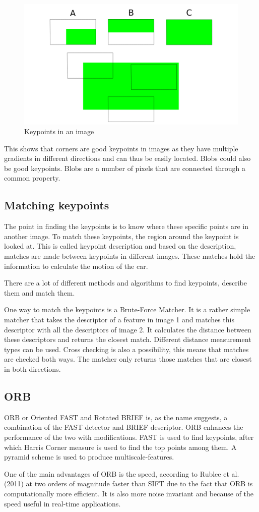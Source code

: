\begin{figure}
    \centering
    \includegraphics[width=1\textwidth]{figures/features.png}
    \caption{Keypoints in an image}
    \label{fig:features}
\end{figure}

This shows that corners are good keypoints in images as they have multiple gradients in different directions and can thus be easily located. Blobs could also be good keypoints. Blobs are a number of pixels that are connected through a common property.

\subsection{Matching keypoints}
The point in finding the keypoints is to know where these specific points are in another image. To match these keypoints, the region around the keypoint is looked at. This is called keypoint description and based on the description, matches are made between keypoints in different images. These matches hold the information to calculate the motion of the car.\bigskip

There are a lot of different methods and algorithms to find keypoints, describe them and match them.\bigskip

One way to match the keypoints is a Brute-Force Matcher. It is a rather simple matcher that takes the descriptor of a feature in image 1 and matches this descriptor with all the descriptors of image 2. It calculates the distance between these descriptors and returns the closest match. Different distance measurement types can be used. Cross checking is also a possibility, this means that matches are checked both ways. The matcher only returns those matches that are closest in both directions.

\subsection{ORB}
ORB or Oriented FAST and Rotated BRIEF is, as the name suggests, a combination of the FAST detector and BRIEF descriptor. ORB enhances the performance of the two with modifications. FAST is used to find keypoints, after which Harris Corner measure is used to find the top points among them. A pyramid scheme is used to produce multiscale-features. \bigskip 

One of the main advantages of ORB is the speed, according to Rublee et al. (2011) \cite{6126544} at two orders of magnitude faster than SIFT due to the fact that ORB is computationally more efficient. It is also more noise invariant and because of the speed useful in real-time applications.

